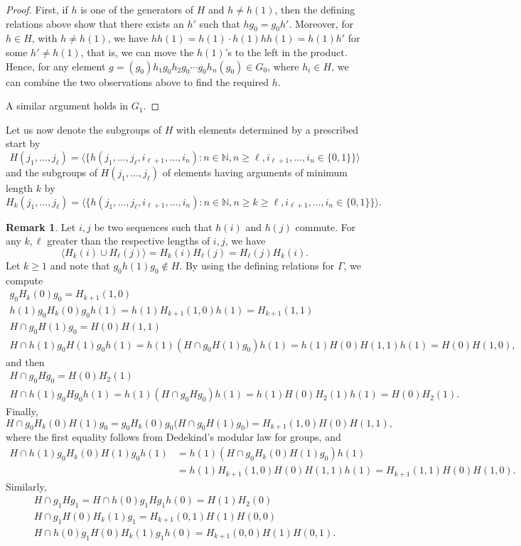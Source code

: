\documentclass[a4paper]{amsart}
\theoremstyle{plain}
\theoremstyle{definition}
\newtheorem{remark}[theorem]{Remark}
\theoremstyle{remark}
\newcommand{\N}{\mathbb{N}}
\numberwithin{theorem}{section}
\begin{document}
\begin{proof}
First, if $h$ is one of the generators of $H$ and $h\neq h(1)$,
then the defining relations above show that there exists an $h'$ such that $hg_0=g_0h'$.
Moreover, for $h\in H$, with $h\neq h(1)$, we have $hh(1)=h(1)\cdot h(1)hh(1)=h(1)h'$ for some $h'\neq h(1)$,
that is, we can move the $h(1)$'s to the left in the product.
Hence, for any element $g=(g_0)h_1g_0h_2g_0\dotsm g_0h_n(g_0)\in G_0$, where $h_i\in H$,
we can combine the two observations above to find the required $h$.

A similar argument holds in $G_1$.
\end{proof}

Let us now denote the subgroups of $H$ with elements determined by a prescribed start by
\[
H(j_1,\dotsc,j_\ell)
= \langle \{ h(j_1,\dotsc,j_\ell,i_{\ell+1},\dotsc,i_n) : n\in\N, n\geq\ell, i_{\ell+1},\dotsc,i_n \in \{ 0,1 \} \} \rangle
\]
and the subgroups of $H(j_1,\dotsc,j_\ell)$ of elements having arguments of minimum length $k$ by
\[
H_k(j_1, \dotsc, j_\ell)
= \langle \{ h(j_1,\dotsc, j_\ell, i_{\ell+1},\dotsc,i_n) : n \in\N, n\geq k\geq\ell, i_{\ell+1},\dotsc,i_n \in \{ 0,1 \} \} \rangle.
\]

\begin{remark}\label{rem:Gammarelations}
Let $i,j$ be two sequences such that $h(i)$ and $h(j)$ commute.
For any $k,\ell$ greater than the respective lengths of $i,j$, we have
\[
\langle H_k(i)\cup H_\ell(j)\rangle = H_k(i)H_\ell(j)=H_\ell(j)H_k(i).
\]
Let $k\geq 1$ and note that $g_0h(1)g_0 \notin H$.
By using the defining relations for $\Gamma$, we compute
\begin{gather*}
g_0H_k(0)g_0=H_{k+1}(1,0) \\
h(1)g_0H_k(0)g_0h(1)=h(1)H_{k+1}(1,0)h(1)=H_{k+1}(1,1) \\
H\cap g_0H(1)g_0=H(0)H(1,1) \\
H\cap h(1)g_0H(1)g_0h(1)=h(1)(H\cap g_0H(1)g_0)h(1)=h(1)H(0)H(1,1)h(1)=H(0)H(1,0),
\end{gather*}
and then
\begin{gather*}
H\cap g_0Hg_0=H(0)H_2(1) \\
H\cap h(1)g_0Hg_0h(1)=h(1)(H\cap g_0Hg_0)h(1)=h(1)H(0)H_2(1)h(1)=H(0)H_2(1).
\end{gather*}
Finally,
\[
H\cap g_0H_k(0)H(1)g_0=g_0H_k(0)g_0\big(H\cap g_0H(1)g_0\big)=H_{k+1}(1,0)H(0)H(1,1),
\]
where the first equality follows from Dedekind's modular law for groups, and
\[
\begin{split}
H\cap h(1)g_0H_k(0)H(1)g_0h(1)&=h(1)(H\cap g_0H_k(0)H(1)g_0)h(1)\\
&=h(1)H_{k+1}(1,0)H(0)H(1,1)h(1) =H_{k+1}(1,1)H(0)H(1,0).
\end{split}
\]
Similarly,
\begin{gather*}
H\cap g_1Hg_1=H\cap h(0)g_1Hg_1h(0)=H(1)H_2(0) \\
H\cap g_1H(0)H_k(1)g_1=H_{k+1}(0,1)H(1)H(0,0) \\
H\cap h(0)g_1H(0)H_k(1)g_1h(0)=H_{k+1}(0,0)H(1)H(0,1).
\end{gather*}
\end{remark}
\end{document}
